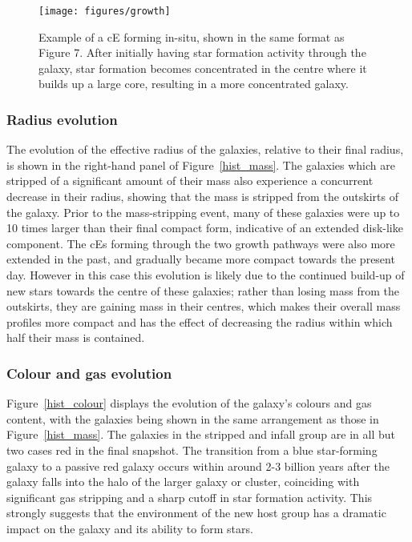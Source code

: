 \documentclass[a4paper,fleqn,usenatbib]{mnras}
\begin{document}
\begin{figure*}
\texttt{[image: figures/growth]}
   \caption{Example of a cE forming in-situ, shown in the same format as Figure 7. After initially having star formation activity through the galaxy, star formation becomes concentrated in the centre where it builds up a large core, resulting in a more concentrated galaxy.}
 \label{growth}
 \end{figure*}

\subsubsection{Radius evolution}

The evolution of the effective radius of the galaxies, relative to their final radius, is shown in the right-hand panel of Figure~\ref{hist_mass}. The galaxies which are stripped of a significant amount of their mass also experience a concurrent decrease in their radius, showing that the mass is stripped from the outskirts of the galaxy. Prior to the mass-stripping event, many of these galaxies were up to 10 times larger than their final compact form, indicative of an extended disk-like component. The cEs forming through the two growth pathways were also more extended in the past, and gradually became more compact towards the present day. However in this case this evolution is likely due to the continued build-up of new stars towards the centre of these galaxies; rather than losing mass from the outskirts, they are gaining mass in their centres, which makes their overall mass profiles more compact and has the effect of decreasing the radius within which half their mass is contained. 

\subsubsection{Colour and gas evolution}

Figure~\ref{hist_colour} displays the evolution of the galaxy's colours and gas content, with the galaxies being shown in the same arrangement as those in Figure~\ref{hist_mass}. The galaxies in the stripped and infall group are in all but two cases red in the final snapshot. The transition from a blue star-forming galaxy to a passive red galaxy occurs within around 2-3 billion years after the galaxy falls into the halo of the larger galaxy or cluster, coinciding with significant gas stripping and a sharp cutoff in star formation activity. This strongly suggests that the environment of the new host group has a dramatic impact on the galaxy and its ability to form stars. 
\end{document}
